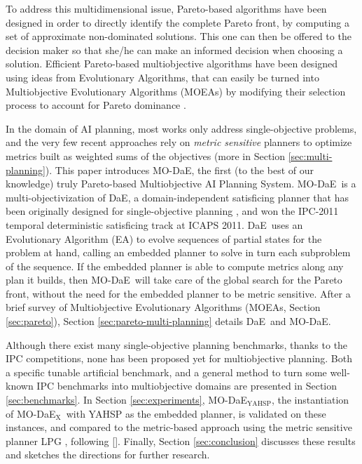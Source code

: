 \documentclass[letterpaper]{article}
\def\DAE{{\sc DaE}}
\def\MODAE{{\sc MO-DaE}}
\newcommand{\MODAEYAHSP}{{\sc MO-DaE$_{\text{YAHSP}}$}}
\newcommand{\MODAEX}{{\sc MO-DaE$_{\text{X}}$}}
\begin{document}
To address this multidimensional issue, Pareto-based algorithms have been designed in order to directly identify the complete Pareto front, by computing a set of approximate non-dominated solutions.
This one can then be offered to the decision maker so that she/he can make an informed decision when choosing a solution. 
Efficient Pareto-based multiobjective algorithms have been designed using ideas from Evolutionary Algorithms, that can easily be turned into Multiobjective Evolutionary Algorithms (MOEAs) by modifying their selection process to account for Pareto dominance \cite{Deb-book}.

In the domain of AI planning, most works only address single-objective problems, and the very few recent approaches rely on {\em metric sensitive} planners to optimize metrics built as weighted sums of the objectives (more in Section \ref{sec:multi-planning}). 
This paper introduces \MODAE, the first (to the best of our knowledge) truly Pareto-based Multiobjective AI Planning System. \MODAE\ is a multi-objectivization of \DAE, a domain-independent satisficing planner that has been originally designed for single-objective planning \cite{evoCOP2006,Bibai2010}, and won the IPC-2011 temporal deterministic satisficing track at ICAPS 2011. \DAE\ uses an Evolutionary Algorithm (EA) to evolve sequences of partial states for the problem at hand, calling an embedded planner to solve in turn each subproblem of the sequence. If the embedded planner is able to compute metrics along any plan it builds, then \MODAE\ will take care of the global search for the Pareto front, without the need for the embedded planner to be metric sensitive. After a brief survey of Multiobjective Evolutionary Algorithms (MOEAs, Section \ref{sec:pareto}), Section \ref{sec:pareto-multi-planning} details \DAE\ and \MODAE.

Although there exist many single-objective planning benchmarks, thanks to the IPC competitions, none has been proposed yet for multiobjective planning. Both a specific tunable artificial benchmark, and a general method to turn some well-known IPC benchmarks into multiobjective domains are presented in Section \ref{sec:benchmarks}. In Section \ref{sec:experiments}, \MODAEYAHSP, the instantiation of \MODAEX\ with YAHSP \cite{Vidal2004} as the embedded planner, is validated on these instances, and compared to the metric-based approach using the metric sensitive planner LPG \cite{gerevini2008}, following \citeauthor{LPG-PlanSIG2012} [\citeyear{LPG-PlanSIG2012}]. Finally, Section \ref{sec:conclusion} discusses these results and sketches the directions for further research.
\end{document}
